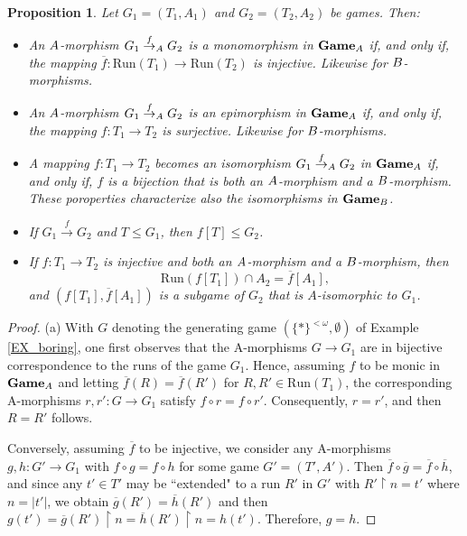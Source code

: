 \documentclass[12pt]{amsart}
\newtheorem{prop}[thm]{Proposition}
\theoremstyle{definition}
\newcommand{\A}{\textup{\textmd{\textsc{A}}}}
\newcommand{\B}{\textup{\textmd{\textsc{B}}}}
\newcommand{\Run}{{\mathrm{Run}}}
\DeclareMathOperator{\restrict}{\upharpoonright}
\newcommand{\Games}{\mathbf{Game}}
\begin{document}
\begin{prop}\label{PROP_morphproperties}
	Let $G_1=(T_1, A_1)$ and $G_2=(T_2, A_2)$ be games. Then:
	\begin{itemize}
		\item[(a)] An $\A$-morphism $G_1\stackrel{f}{\to}_\A G_2$ is a monomorphism in $\Games_\A$ if, and only if, the mapping $\overline{f}\colon \Run(T_1)\to \Run(T_2)$ is injective. Likewise for $\B$-morphisms. 
		
		\item[(b)] An $\A$-morphism $G_1\stackrel{f}{\to}_\A G_2$ is an epimorphism in $\Games_\A$ if, and only if, the mapping $f\colon T_1\to T_2$ is surjective. Likewise for $\B$-morphisms. 
		
		\item[(c)]\label{PROP_IT_iso} A mapping $f\colon T_1\to T_2$ becomes an isomorphism $G_1\stackrel{f}{\to}_\A G_2$ in $\Games_{\A}$ if, and only if, $f$ is a bijection that is both an $\A$-morphism and a $\B$-morphism. These poroperties characterize also the isomorphisms in $\Games_\B$.			
		\item[(d)] If $G_1\stackrel{f}{\to} G_2$ and $T\le G_1$, then $f[T]\le G_2$.
		
		\item[(e)]\label{PROP_IT_embbeding} If $f\colon T_1\to T_2$ is injective and both an $\A$-morphism and a $\B$-morphism, then
		\[
		\Run(f[T_1])\cap A_2 = \overline{f}[A_1],
		\]
		and $\left(f[T_1],\overline{f}[A_1]\right)$ is a subgame of $G_2$ that is $A$-isomorphic to $G_1$.
	\end{itemize}
\end{prop}
\begin{proof}
	(a) With $G$ denoting the generating game $(\{*\}^{<\omega},\emptyset)$ of Example \ref{EX_boring}, one first observes that the A-morphisms $G\to G_1$ are in bijective correspondence to the runs of the game $G_1$. Hence, assuming $f$ to be monic in $\Games_{\A}$ and letting $\overline{f}(R)=\overline{f}(R')$ for $R,R'\in\mathrm{Run}(T_1)$, the corresponding A-morphisms $r,r':G\to G_1$ satisfy $f\circ r=f\circ r'$. Consequently, $r=r'$, and then $R=R'$ follows. 
	
	Conversely, assuming $\overline{f}$ to be injective, we consider any A-morphisms $g,h:G'\to G_1$ with $f\circ g=f\circ h$ for some game $G'=(T',A')$. Then $\overline{f}\circ\overline{g}=\overline{f}\circ\overline{h}$, and since any $t'\in T'$ may be ``extended" to a run $R'$ in $G'$ with $R'\restrict n=t'$ where $n=|t'|$, we obtain $\overline{g}(R')=\overline{h}(R')$ and then $g(t')=\overline{g}(R')\restrict n=\overline{h}(R')\restrict n=h(t')$. Therefore, $g=h$. 
\end{proof}
\end{document}
